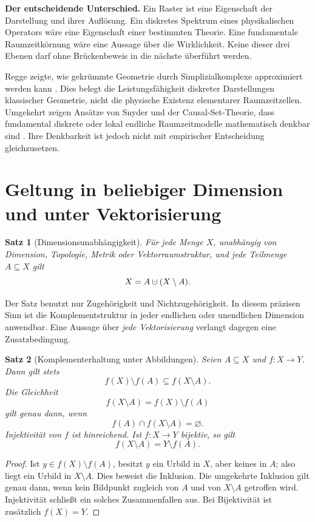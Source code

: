 \documentclass[11pt,a4paper]{article}
\newtheorem{satz}{Satz}[section]
\theoremstyle{remark}
\newcommand{\statusbox}[2]{%
  \par\medskip\noindent
  \colorbox{#1}{\parbox{\dimexpr\linewidth-2\fboxsep\relax}{#2}}%
  \par\medskip
}
\newcommand{\dotcup}{\mathbin{\mathaccent\cdot\cup}}
\begin{document}
\statusbox{QLight}{
\textbf{Der entscheidende Unterschied.}
Ein Raster ist eine Eigenschaft der Darstellung und ihrer Auflösung. Ein
diskretes Spektrum eines physikalischen Operators wäre eine Eigenschaft einer
bestimmten Theorie. Eine fundamentale Raumzeitkörnung wäre eine Aussage über
die Wirklichkeit. Keine dieser drei Ebenen darf ohne Brückenbeweis in die
nächste überführt werden.
}

Regge zeigte, wie gekrümmte Geometrie durch Simplizialkomplexe approximiert
werden kann \citep{regge1961}. Dies belegt die Leistungsfähigkeit diskreter
Darstellungen klassischer Geometrie, nicht die physische Existenz elementarer
Raumzeitzellen. Umgekehrt zeigen Ansätze von Snyder und der Causal-Set-Theorie,
dass fundamental diskrete oder lokal endliche Raumzeitmodelle mathematisch
denkbar sind \citep{snyder1947,bombelli1987}. Ihre Denkbarkeit ist jedoch
nicht mit empirischer Entscheidung gleichzusetzen.

\section{Geltung in beliebiger Dimension und unter Vektorisierung}
\label{sec:dimension}

\begin{satz}[Dimensionsunabhängigkeit]
Für jede Menge \(X\), unabhängig von Dimension, Topologie, Metrik oder
Vektorraumstruktur, und jede Teilmenge \(A\subseteq X\) gilt
\[
  X=A\dotcup(X\setminus A).
\]
\end{satz}

Der Satz benutzt nur Zugehörigkeit und Nichtzugehörigkeit. In diesem präzisen
Sinn ist die Komplementstruktur in jeder endlichen oder unendlichen Dimension
anwendbar. Eine Aussage über \emph{jede Vektorisierung} verlangt dagegen eine
Zusatzbedingung.

\begin{satz}[Komplementerhaltung unter Abbildungen]
\label{satz:abbildung}
Seien \(A\subseteq X\) und \(f:X\to Y\). Dann gilt stets
\[
  f(X)\setminus f(A)\subseteq f(X\setminus A).
\]
Die Gleichheit
\[
  f(X\setminus A)=f(X)\setminus f(A)
\]
gilt genau dann, wenn
\[
  f(A)\cap f(X\setminus A)=\varnothing.
\]
Injektivität von \(f\) ist hinreichend. Ist \(f:X\to Y\) bijektiv, so gilt
\[
  f(X\setminus A)=Y\setminus f(A).
\]
\end{satz}

\begin{proof}
Ist \(y\in f(X)\setminus f(A)\), besitzt \(y\) ein Urbild in \(X\), aber
keines in \(A\); also liegt ein Urbild in \(X\setminus A\). Dies beweist die
Inklusion. Die umgekehrte Inklusion gilt genau dann, wenn kein Bildpunkt
zugleich von \(A\) und von \(X\setminus A\) getroffen wird. Injektivität
schließt ein solches Zusammenfallen aus. Bei Bijektivität ist zusätzlich
\(f(X)=Y\).
\end{proof}
\end{document}
